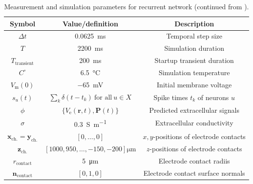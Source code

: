 \begin{table}[!htp]
\caption{ Measurement and simulation parameters for recurrent network (continued from ).}
\begin{center}
\begin{tabular}{|c|c|c|}
\hline
Symbol & Value/definition & Description \\
\hline
$\Delta t$ & \SI{0.0625}{\milli\second} & Temporal step size \\
$T$ & \SI{2200}{\milli\second} & Simulation duration \\
$T_\text{transient}$ &  \SI{200}{\milli\second} & Startup transient duration  \\
$C^\circ$ & \SI{6.5}{\celsius} & Simulation temperature \\
$V_\text{m}(0)$ & \SI{-65}{\milli\volt} & Initial membrane voltage \\
\hline
$s_u(t)$ & $\sum_k \delta(t - t_k)~\text{for all}~u \in X $ & Spike times $t_k$ of neurons $u$ \\
\hline
$\phi$ & $\{V_\text{e}(\mathbf{r}, t), \mathbf{P}(t) \} $ & Predicted extracellular signals \\ 
$\sigma$ & \SI{0.3}{\siemens\per\metre} & Extracellular conductivity \\
$\mathbf{x}_\text{ch.}=\mathbf{y}_\text{ch.}$ & $[0, \ldots, 0 ]$ & $x,y$-positions of electrode contacts \\
$\mathbf{z}_\text{ch.}$ & $[1000, 950, \ldots, -150, -200 ]\si{\micro\metre}$  & $z$-positions of electrode contacts \\
$r_\text{contact}$ & \SI{5}{\micro\metre} & Electrode contact radiis \\
$\mathbf{n}_\text{contact}$ & $[0, 1, 0]$ & Electrode contact surface normals \\
\hline
\end{tabular}
\end{center}
\label{tab:Ch-LFPy:MC-network-III}
\end{table}

